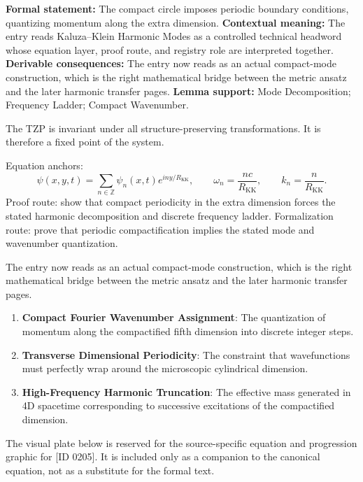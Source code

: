 \begingroup\footnotesize\setlength{\emergencystretch}{3em}\sloppy
\textbf{Formal statement:} The compact circle imposes periodic boundary conditions, quantizing momentum along the extra dimension. \textbf{Contextual meaning:} The entry reads Kaluza--Klein Harmonic Modes as a controlled technical headword whose equation layer, proof route, and registry role are interpreted together. \textbf{Derivable consequences:} The entry now reads as an actual compact-mode construction, which is the right mathematical bridge between the metric ansatz and the later harmonic transfer pages. \textbf{Lemma support:} Mode Decomposition; Frequency Ladder; Compact Wavenumber.\par
\endgroup

The TZP is invariant under all structure-preserving transformations. It is therefore a fixed point of the system.

Equation anchors:
\[
\psi(x,y,t)=\sum_{n\in\mathbb{Z}}\psi_n(x,t)e^{iny/R_{\mathrm{KK}}},
\qquad
\omega_n=\frac{nc}{R_{\mathrm{KK}}},
\qquad
k_n=\frac{n}{R_{\mathrm{KK}}}.
\]
Proof route: show that compact periodicity in the extra dimension forces the stated harmonic decomposition and discrete frequency ladder. Formalization route: prove that periodic compactification implies the stated mode and wavenumber quantization.

The entry now reads as an actual compact-mode construction, which is the right mathematical bridge between the metric ansatz and the later harmonic transfer pages.
\endgroup

\begin{enumerate}[leftmargin=1.6em,itemsep=6pt,topsep=4pt]
\item \textbf{Compact Fourier Wavenumber Assignment}: The quantization of momentum along the compactified fifth dimension into discrete integer steps.
\item \textbf{Transverse Dimensional Periodicity}: The constraint that wavefunctions must perfectly wrap around the microscopic cylindrical dimension.
\item \textbf{High-Frequency Harmonic Truncation}: The effective mass generated in 4D spacetime corresponding to successive excitations of the compactified dimension.
\end{enumerate}

\begingroup\footnotesize\sloppy
The visual plate below is reserved for the source-specific equation and progression graphic for [ID 0205]. It is included only as a companion to the canonical equation, not as a substitute for the formal text.
\par\endgroup
\ifTZPDarkEdition
{}
\fi

